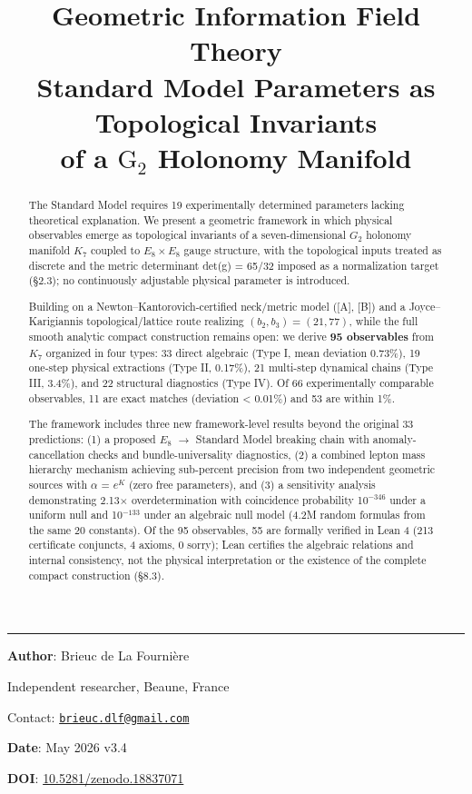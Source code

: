 \documentclass[11pt,a4paper]{article}
\title{%
\LARGE\textbf{Geometric Information Field Theory}\\[0.3em]
\large Standard Model Parameters as Topological Invariants\\
of a $\mathrm{G}_2$ Holonomy Manifold%
}
\author{}
\date{}
\begin{document}
\maketitle
\noindent\rule{\textwidth}{0.2pt}

\noindent\textbf{Author}: Brieuc de La Fourni\`ere

\noindent Independent researcher, Beaune, France

\noindent Contact: \href{mailto:brieuc.dlf@gmail.com}{\texttt{brieuc.dlf@gmail.com}}

\noindent\textbf{Date}: May 2026 \quad v3.4

\noindent\textbf{DOI}: \href{https://doi.org/10.5281/zenodo.18837071}{10.5281/zenodo.18837071}

\vfill

\begin{abstract}

The Standard Model requires 19 experimentally determined parameters
lacking theoretical explanation. We present a geometric framework in
which physical observables emerge as topological invariants of a
seven-dimensional \(G_{2}\) holonomy manifold \(K_{7}\) coupled to
\(E_{8} \times E_{8}\) gauge structure, with the topological inputs treated as discrete and the metric determinant det(g) = 65/32 imposed as a normalization target (§2.3); no continuously adjustable physical parameter is introduced.

Building on a Newton--Kantorovich-certified neck/metric model
([A], [B]) and a Joyce--Karigiannis topological/lattice route
realizing \((b_{2}, b_{3}) = (21, 77)\), while the full smooth
analytic compact construction remains open: we derive \textbf{95
observables} from \(K_{7}\) organized in four types: 33 direct
algebraic (Type I, mean deviation 0.73\%), 19 one-step physical
extractions (Type II, 0.17\%), 21 multi-step dynamical chains (Type III,
3.4\%), and 22 structural diagnostics (Type IV). Of 66 experimentally
comparable observables, 11 are exact matches (deviation \textless{}
0.01\%) and 53 are within 1\%.

The framework includes three new framework-level results beyond the original 33
predictions: (1) a proposed \(E_{8}\) \(\to\) Standard Model breaking chain with anomaly-cancellation checks and bundle-universality diagnostics, (2) a
combined lepton mass hierarchy mechanism achieving sub-percent precision
from two independent geometric sources with \(\alpha\) = \(e^K\) (zero
free parameters), and (3) a sensitivity analysis demonstrating
2.13\(\times\) overdetermination with coincidence probability
10\(^{-346}\) under a uniform null and 10\(^{-133}\) under an algebraic
null model (4.2M random formulas from the same 20 constants). Of the 95
observables, 55 are formally verified in Lean 4 (213 certificate
conjuncts, 4 axioms, 0 sorry); Lean certifies the algebraic relations
and internal consistency, not the physical interpretation or the
existence of the complete compact construction (§8.3).


\end{abstract}
\end{document}
